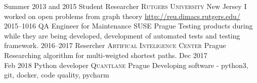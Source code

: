 \cventry
    {Summer 2013 and 2015}
    {Student Researcher}
    {\textsc{Rutgers University}}
    {New Jersey}
    {I worked on open problems from graph theory} 
    {\url{http://reu.dimacs.rutgers.edu/}}
\cventry
    {2015--1016}
    {QA Engineer for Maintenance}
    {\textsc{SUSE}}
    {Prague}
    {}
    {Testing products during while they are being developed, development of automated tests and testing framework.
}
\cventry
    {2016--2017}
    {Resercher}
    {\textsc{Artifical Inteligence Center}}
    {Prague}
    {}
    {Researching algorithm for multi-weigted shortest paths.}
\cventry
    {Dec 2017 \\ Feb 2018}
    {Python developer}
    {\textsc{Quantlane}}
    {Prague}
    {}
    {Developing software - python3, git, docker, code quality, pycharm}





